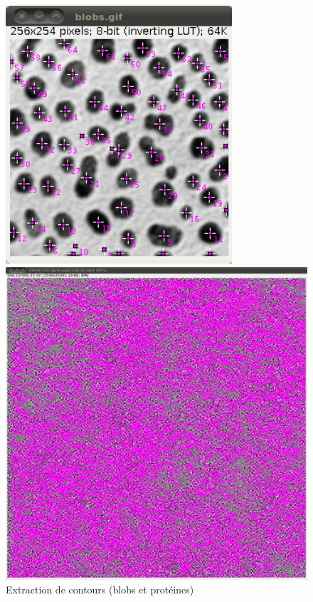 \begin{figure}[!ht]
\begin{center}
 \begin{minipage}{.450\linewidth}
  \includegraphics[width=0.75\textwidth]{blobDilate.png}  
 \end{minipage} \hfill
\begin{minipage}{.450\linewidth}
  \includegraphics[width=1\textwidth]{protDilate.png}   
 \end{minipage} \hfill
\caption{Extraction de contours (blobs et protéines)}
\end{center}
\end{figure}

